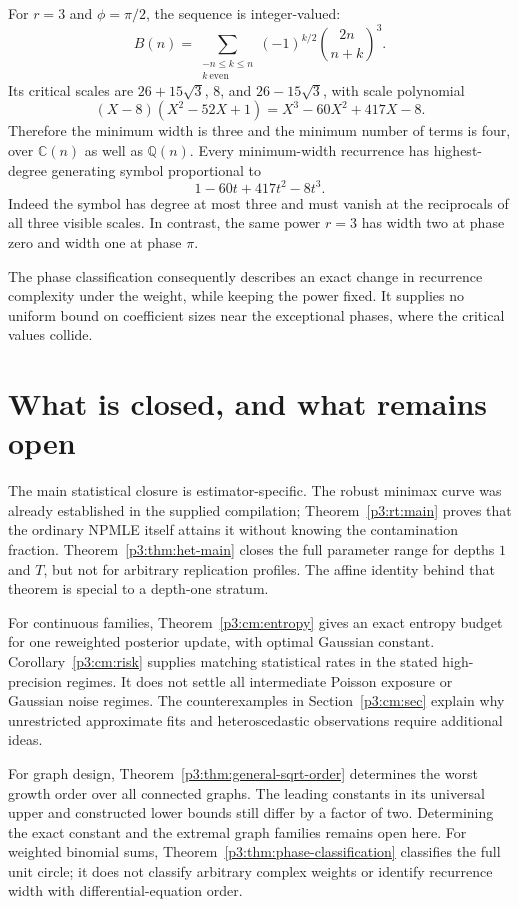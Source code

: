 \documentclass[11pt,a4paper]{article}
\theoremstyle{definition}
\theoremstyle{remark}
\numberwithin{equation}{section}
\begin{document}
For $r=3$ and $\phi=\pi/2$, the sequence is integer-valued:
\[
 B(n)=\sum_{\substack{-n\leq k\leq n\\k\ \mathrm{even}}}
        (-1)^{k/2}\binom{2n}{n+k}^{3}.
\]
Its critical scales are $26+15\sqrt3$, $8$, and $26-15\sqrt3$,
with scale polynomial
\[
 (X-8)(X^2-52X+1)=X^3-60X^2+417X-8.
\]
Therefore the minimum width is three and the minimum number of
terms is four, over $\mathbb C(n)$ as well as $\mathbb Q(n)$.
Every minimum-width recurrence has highest-degree generating symbol
proportional to
\[
 1-60t+417t^2-8t^3.
\]
Indeed the symbol has degree at most three and must vanish at the
reciprocals of all three visible scales. In contrast, the same power
$r=3$ has width two at phase zero and width one at phase $\pi$.

The phase classification consequently describes an exact change in
recurrence complexity under the weight, while keeping the power
fixed. It supplies no uniform bound on coefficient sizes near the
exceptional phases, where the critical values collide.


\section{What is closed, and what remains open}

The main statistical closure is estimator-specific. The robust minimax
curve was already established in the supplied compilation; Theorem~\ref{p3:rt:main}
proves that the ordinary NPMLE itself attains it without knowing the
contamination fraction. Theorem~\ref{p3:thm:het-main} closes the full parameter
range for depths $1$ and $T$, but not for arbitrary replication profiles.
The affine identity behind that theorem is special to a depth-one stratum.

For continuous families, Theorem~\ref{p3:cm:entropy} gives an exact entropy
budget for one reweighted posterior update, with optimal Gaussian constant.
Corollary~\ref{p3:cm:risk} supplies matching statistical rates in the stated
high-precision regimes. It does not settle all intermediate Poisson exposure
or Gaussian noise regimes. The counterexamples in Section~\ref{p3:cm:sec}
explain why unrestricted approximate fits and heteroscedastic observations
require additional ideas.

For graph design, Theorem~\ref{p3:thm:general-sqrt-order} determines the worst
growth order over all connected graphs. The leading constants in its
universal upper and constructed lower bounds still differ by a factor of
two. Determining the exact constant and the extremal graph families remains
open here. For weighted binomial sums, Theorem~\ref{p3:thm:phase-classification}
classifies the full unit circle; it does not classify arbitrary complex
weights or identify recurrence width with differential-equation order.
\end{document}
